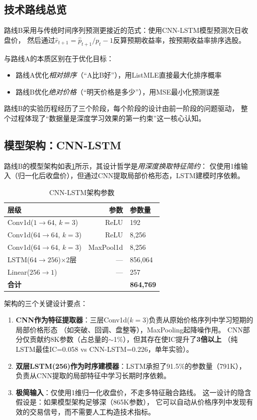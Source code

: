 \documentclass[12pt,a4paper]{ctexart}
\begin{document}
\subsection{技术路线总览}

路线B采用与传统时间序列预测更接近的范式：使用CNN-LSTM模型预测次日收盘价，
然后通过$\hat{r}_{t+1} = \hat{p}_{t+1} / p_t - 1$反算预期收益率，按预期收益率排序选股。

与路线A的本质区别在于优化目标：
\begin{itemize}[leftmargin=*]
    \item 路线A优化\emph{相对排序}（“A比B好”），用ListMLE直接最大化排序概率
    \item 路线B优化\emph{绝对价格}（“明天价格是多少”），用MSE最小化预测误差
\end{itemize}

路线B的实验历程经历了三个阶段，每个阶段的设计由前一阶段的问题驱动，
整个过程体现了“数据量是深度学习效果的第一约束”这一核心认知。

\subsection{模型架构：CNN-LSTM}

路线B的模型架构如表\ref{tab:wu_arch}所示，其设计哲学是\emph{用深度换取特征简约}：
仅使用1维输入（归一化后收盘价），但通过CNN提取局部价格形态，LSTM建模时序依赖。

\begin{table}[htbp]
\centering
\caption{CNN-LSTM架构参数}
\label{tab:wu_arch}
\begin{tabular}{lrl}
\toprule
层级 & 参数 & 参数量 \\
\midrule
Conv1d($1\to64$, $k=3$) & ReLU & 192 \\
Conv1d($64\to64$, $k=3$) & ReLU & 8,256 \\
Conv1d($64\to64$, $k=3$) & MaxPool1d & 8,256 \\
LSTM($64\to256$)$\times$2层 & — & 856,064 \\
Linear($256\to1$) & — & 257 \\
\midrule
\textbf{合计} & & \textbf{864,769} \\
\bottomrule
\end{tabular}
\end{table}

架构的三个关键设计要点：

\begin{enumerate}[leftmargin=*]
    \item \textbf{CNN作为特征提取器}：三层Conv1d($k=3$)负责从原始价格序列中学习短期的局部价格形态
          （如突破、回调、盘整等），MaxPooling起降噪作用。
          CNN部分仅贡献约8K参数（占总量的$\sim$1\%），但其存在使IC提升了\textbf{3倍以上}
          （纯LSTM最佳IC=0.058 vs CNN-LSTM=0.226，单年实验）。
    \item \textbf{双层LSTM(256)作为时序建模器}：LSTM承担了91.5\%的参数量（791K），
          负责从CNN提取的局部特征中学习长期时序依赖。
    \item \textbf{极简输入}：仅使用1维归一化收盘价，不走多特征融合路线。
          这一设计的隐含假设是：如果模型架构足够深（865K参数），
          它可以自动从价格序列中发现有效的交易信号，而不需要人工构造技术指标。
\end{enumerate}
\end{document}

